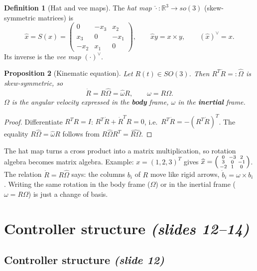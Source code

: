 \documentclass[11pt,a4paper]{article}
\newcommand{\R}{\mathbb{R}}
\newcommand{\hatm}[1]{\widehat{#1}}          %
\newcommand{\VEE}{^{\vee}}
\newcommand{\sli}[1]{\emph{(#1)}}
\theoremstyle{definition}
\newtheorem{definition}{Definition}[section]
\theoremstyle{plain}
\newtheorem{proposition}[definition]{Proposition}
\theoremstyle{remark}
\begin{document}
\begin{definition}[Hat and vee maps]
The \emph{hat map} $\hatm{\cdot}:\R^3\to so(3)$ (skew-symmetric matrices) is
\[
\hatm{x}=S(x)=\begin{pmatrix}0&-x_3&x_2\\x_3&0&-x_1\\-x_2&x_1&0\end{pmatrix},\qquad \hatm{x}y=x\times y,\qquad(\hatm{x})\VEE=x.
\]
Its inverse is the \emph{vee map} $(\cdot)\VEE$.
\end{definition}

\begin{proposition}[Kinematic equation]
Let $R(t)\in SO(3)$. Then $R^T\dot R=:\hatm\Omega$ is skew-symmetric, so
\[
\dot R=R\hatm\Omega=\hatm\omega R,\qquad \omega=R\Omega .
\]
$\Omega$ is the angular velocity expressed in the \textbf{body} frame, $\omega$ in the \textbf{inertial} frame.
\end{proposition}
\begin{proof}
Differentiate $R^TR=I$: $R^T\dot R+\dot R^TR=0$, i.e.\ $R^T\dot R=-(R^T\dot R)^T$. The equality $R\hatm\Omega=\hatm\omega R$ follows from $R\hatm\Omega R^T=\widehat{R\Omega}$.
\end{proof}

\begin{intuition}
The hat map turns a cross product into a matrix multiplication, so rotation algebra becomes matrix algebra. Example: $x=(1,2,3)^T$ gives $\hatm x=\begin{psmallmatrix}0&-3&2\\3&0&-1\\-2&1&0\end{psmallmatrix}$. The relation $\dot R=R\hatm\Omega$ says: the columns $b_i$ of $R$ move like rigid arrows, $\dot b_i=\omega\times b_i$. Writing the same rotation in the body frame ($\Omega$) or in the inertial frame ($\omega=R\Omega$) is just a change of basis.
\end{intuition}

\section{Controller structure \sli{slides 12--14}}

\subsection{Controller structure \sli{slide 12}}
\end{document}
